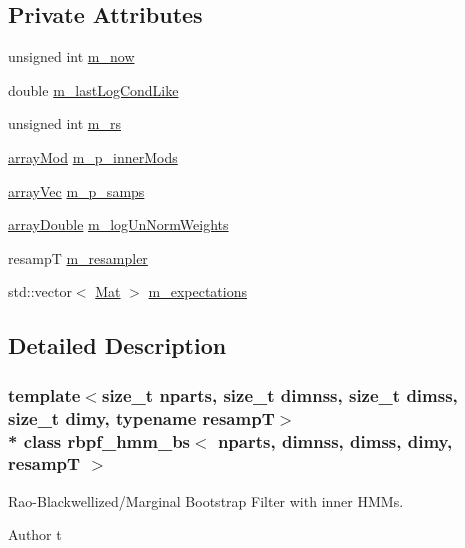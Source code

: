 \subsection*{Private Attributes}
\begin{DoxyCompactItemize}
\item 
unsigned int \hyperlink{classrbpf__hmm__bs_ae0102fba0fb6873f0d01ef873fe8dbb1}{m\+\_\+now}
\item 
double \hyperlink{classrbpf__hmm__bs_a84b69c77970140adb2affbdc800e76cc}{m\+\_\+last\+Log\+Cond\+Like}
\item 
unsigned int \hyperlink{classrbpf__hmm__bs_a0b81a949e21d9c1f3c1dcb5c6c4840e2}{m\+\_\+rs}
\item 
\hyperlink{classrbpf__hmm__bs_a9772cd625f6a416ccd54558108b1d7a3}{array\+Mod} \hyperlink{classrbpf__hmm__bs_a66e06e277278568dd484b36065ad38ee}{m\+\_\+p\+\_\+inner\+Mods}
\item 
\hyperlink{classrbpf__hmm__bs_a18441e40d4353bf4b91e6cbac001a28b}{array\+Vec} \hyperlink{classrbpf__hmm__bs_a51c48b58b2be3a82a61fed0f1a44f06d}{m\+\_\+p\+\_\+samps}
\item 
\hyperlink{classrbpf__hmm__bs_a97b5eab2c1fc8acffbdb8941432e8c00}{array\+Double} \hyperlink{classrbpf__hmm__bs_a6a4c6cd6a2ac836dd74d475560aa4048}{m\+\_\+log\+Un\+Norm\+Weights}
\item 
resampT \hyperlink{classrbpf__hmm__bs_a164a9d81ede5be6a9ca0dd33cdffb3c0}{m\+\_\+resampler}
\item 
std\+::vector$<$ \hyperlink{classrbpf__hmm__bs_a8f6996a1394c31ac65859de96f195f3a}{Mat} $>$ \hyperlink{classrbpf__hmm__bs_ac6ab8e527331e321da58501e4a4da14e}{m\+\_\+expectations}
\end{DoxyCompactItemize}


\subsection{Detailed Description}
\subsubsection*{template$<$size\+\_\+t nparts, size\+\_\+t dimnss, size\+\_\+t dimss, size\+\_\+t dimy, typename resampT$>$\\*
class rbpf\+\_\+hmm\+\_\+bs$<$ nparts, dimnss, dimss, dimy, resamp\+T $>$}

Rao-\/\+Blackwellized/\+Marginal Bootstrap Filter with inner H\+M\+Ms. 

\begin{DoxyAuthor}{Author}
t 
\end{DoxyAuthor}


